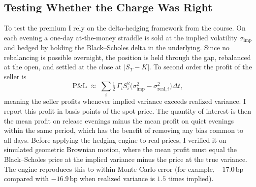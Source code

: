 \documentclass[10pt]{article}
\newcommand{\bp}{\,\mathrm{bp}}
\begin{document}
\subsection{Testing Whether the Charge Was Right}
To test the premium I rely on the delta-hedging framework from the course. On each evening a one-day at-the-money straddle is sold at the implied volatility $\sigma_{\mathrm{imp}}$ and hedged by holding the Black--Scholes delta in the underlying. Since no rebalancing is possible overnight, the position is held through the gap, rebalanced at the open, and settled at the close at $|S_T-K|$. To second order the profit of the seller is
\begin{equation}
\text{P\&L} \;\approx\; \sum_i \tfrac12\,\Gamma_i S_i^2\bigl(\sigma_{\mathrm{imp}}^2-\sigma_{\mathrm{real},i}^2\bigr)\Delta t ,
\end{equation}
meaning the seller profits whenever implied variance exceeds realized variance. I report this profit in basis points of the spot price. The quantity of interest is then the mean profit on release evenings minus the mean profit on quiet evenings within the same period, which has the benefit of removing any bias common to all days. Before applying the hedging engine to real prices, I verified it on simulated geometric Brownian motion, where the mean profit must equal the Black--Scholes price at the implied variance minus the price at the true variance. The engine reproduces this to within Monte Carlo error (for example, $-17.0\bp$ compared with $-16.9\bp$ when realized variance is $1.5$ times implied).
\end{document}
